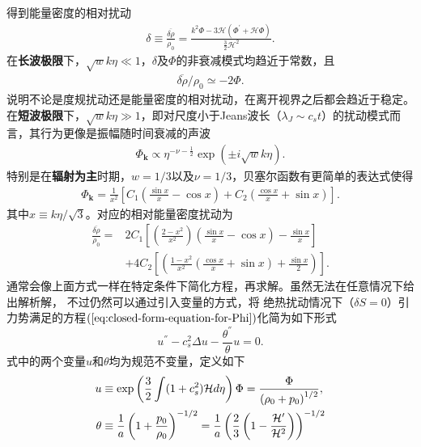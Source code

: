 得到能量密度的相对扰动
\begin{align}
  \label{eq:gauge-invariant-relative-energy-density-perturbation}
  \delta\equiv\frac{\overline{\delta\rho}}{\rho_0}
  =\frac{k^2 \Phi -3\mathcal{H}{\left(\Phi^\prime+\mathcal{H}\Phi\right)}}{\frac{3}{2}\mathcal{H}^2}.
\end{align}
在\textbf{长波极限}下，$\sqrt{w}k\eta\ll
1$，$\delta$及$\Phi$的非衰减模式均趋近于常数，且
\begin{align}
  \overline{\delta\rho} /\rho_0\simeq -2\Phi.
\end{align}
说明不论是度规扰动还是能量密度的相对扰动，在离开视界之后都会趋近于稳定。\\
在\textbf{短波极限}下，$\sqrt{w}k\eta\gg 1$，即对尺度小于Jeans波长（$\lambda_{J}\sim
c_{s}t$）的扰动模式而言，其行为更像是振幅随时间衰减的声波
\begin{align}
  \Phi_{\mathbf{k}}\propto \eta^{-\nu-\frac{1}{2}}\exp{\left(\pm
  i\sqrt{w}k\eta\right)}. 
\end{align}
特别是在\textbf{辐射为主}时期，$w=1 /3$以及$\nu=1
/3$，贝塞尔函数有更简单的表达式使得
\begin{align}
  \label{eq:Phi-in-radiation-dominated}
  \Phi_{\mathbf{k}}=\frac{1}{x^2}{\left[
  C_1{\left(\frac{\sin x}{x}-\cos x\right)}+
  C_2{\left(\frac{\cos x}{x}+\sin x\right)}\right]}.
\end{align}
其中$x\equiv k\eta /\sqrt{3}$。对应的相对能量密度扰动为
\begin{align}
  \frac{\overline{\delta\rho}}{\rho_0}=
  &2C_1{\left[{\left(\frac{2-x^2}{x^2}\right)}{\left(\frac{\sin x}{x}-\cos x\right)}-\frac{\sin x}{x}\right]}
  \\
  &+4C_2{\left[{\left(\frac{1-x^2}{x^2}{\left(\frac{\cos x}{x}+\sin x\right)}+\frac{\sin x}{2}\right)}\right]}.
\end{align}
通常会像上面方式一样在特定条件下简化方程，再求解。虽然无法在任意情况下给出解析解，
不过仍然可以通过引入变量的方式，将
绝热扰动情况下（$\delta S=0$）引力势满足的方程$(\ref{eq:closed-form-equation-for-Phi})$化简为如下形式
\begin{equation}
  \label{eq:ms-like-bardeen-equation}
  u^{\dprime}-c_{s}^2\Delta u - \frac{\theta^{\dprime}}{\theta} u = 0. 
\end{equation}
式中的两个变量$u$和$\theta$均为规范不变量，定义如下
\begin{align}
  \label{eq:u-theta-defininition}
  u &\equiv \exp\left(\frac{3}{2}\int (1+c_{s}^2)\mathcal{H}d\eta\right)\Phi 
      =\frac{\Phi}{\left(\rho_0+p_0\right)^{1 /2}}, \\
  \theta &\equiv \frac{1}{a}\left(1+\frac{p_0}{\rho_0}\right)^{-1 /2}=
  \frac{1}{a}\left(\frac{2}{3}\left(1-\frac{\mathcal{H^\prime}}{\mathcal{H}^2}\right)\right)^{-1
  /2}
\end{align}

